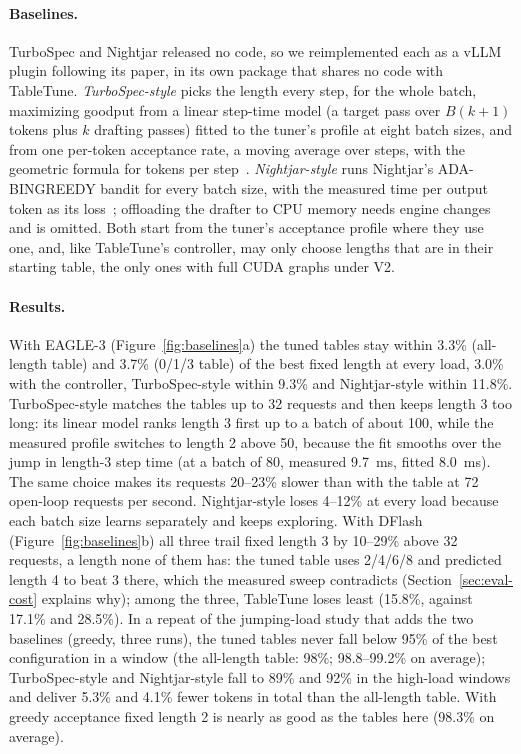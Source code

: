 \documentclass{article}
\newcommand{\sys}{TableTune}
\begin{document}
\paragraph{Baselines.} TurboSpec and Nightjar released no code, so we reimplemented each as a vLLM plugin following its paper, in its own package that shares no code with \sys{}. \emph{TurboSpec-style} picks the length every step, for the whole batch, maximizing goodput from a linear step-time model (a target pass over $B(k{+}1)$ tokens plus $k$ drafting passes) fitted to the tuner's profile at eight batch sizes, and from one per-token acceptance rate, a moving average over steps, with the geometric formula for tokens per step~\cite{liu2024turbospec}. \emph{Nightjar-style} runs Nightjar's ADA-BINGREEDY bandit for every batch size, with the measured time per output token as its loss~\cite{li2025nightjar}; offloading the drafter to CPU memory needs engine changes and is omitted. Both start from the tuner's acceptance profile where they use one, and, like \sys{}'s controller, may only choose lengths that are in their starting table, the only ones with full CUDA graphs under V2.

\paragraph{Results.} With EAGLE-3 (Figure~\ref{fig:baselines}a) the tuned tables stay within 3.3\% (all-length table) and 3.7\% (0/1/3 table) of the best fixed length at every load, 3.0\% with the controller, TurboSpec-style within 9.3\% and Nightjar-style within 11.8\%. TurboSpec-style matches the tables up to 32 requests and then keeps length 3 too long: its linear model ranks length 3 first up to a batch of about 100, while the measured profile switches to length 2 above 50, because the fit smooths over the jump in length-3 step time (at a batch of 80, measured 9.7~ms, fitted 8.0~ms). The same choice makes its requests 20--23\% slower than with the table at 72 open-loop requests per second. Nightjar-style loses 4--12\% at every load because each batch size learns separately and keeps exploring. With DFlash (Figure~\ref{fig:baselines}b) all three trail fixed length 3 by 10--29\% above 32 requests, a length none of them has: the tuned table uses 2/4/6/8 and predicted length 4 to beat 3 there, which the measured sweep contradicts (Section~\ref{sec:eval-cost} explains why); among the three, \sys{} loses least (15.8\%, against 17.1\% and 28.5\%). In a repeat of the jumping-load study that adds the two baselines (greedy, three runs), the tuned tables never fall below 95\% of the best configuration in a window (the all-length table: 98\%; 98.8--99.2\% on average); TurboSpec-style and Nightjar-style fall to 89\% and 92\% in the high-load windows and deliver 5.3\% and 4.1\% fewer tokens in total than the all-length table. With greedy acceptance fixed length 2 is nearly as good as the tables here (98.3\% on average).
\end{document}
